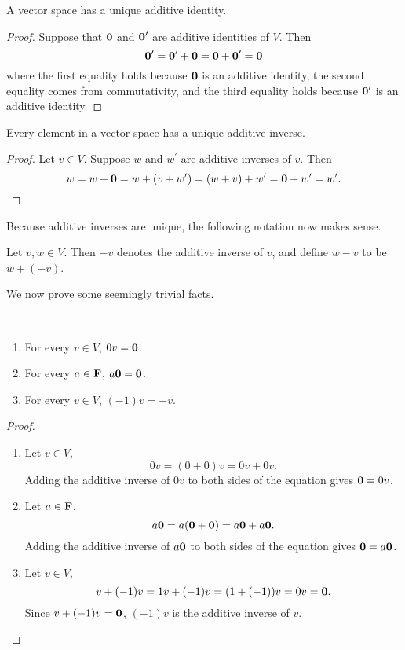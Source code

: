 \begin{lemma}
A vector space has a unique additive identity.
\end{lemma}

\begin{proof}
Suppose that $\vb{0}$ and $\vb{0}^\prime$ are additive identities of $V$. Then
\[\vb{0}^\prime=\vb{0}^\prime+\vb{0}=\vb{0}+\vb{0}^\prime=\vb{0}\]
where the first equality holds because $\vb{0}$ is an additive identity, the second equality comes from commutativity, and the third equality holds because $\vb{0}^\prime$ is an additive identity.
\end{proof}

\begin{lemma}
Every element in a vector space has a unique additive inverse.
\end{lemma}

\begin{proof}
Let $v\in V$. Suppose $w$ and $w^\prime$ are additive inverses of $v$. Then
\[w=w+\vb{0}=w+(v+w^\prime)=(w+v)+w^\prime=\vb{0}+w^\prime=w^\prime.\]
\end{proof}

Because additive inverses are unique, the following notation now makes sense.

\begin{notation}
Let $v,w\in V$. Then $-v$ denotes the additive inverse of $v$, and define $w-v$ to be $w+(-v)$.
\end{notation}

We now prove some seemingly trivial facts.

\begin{lemma} \
\begin{enumerate}[label=(\roman*)]
\item For every $v\in V$, $0v=\vb{0}$.
\item For every $a\in\mathbf F$, $a\vb{0}=\vb{0}$.
\item For every $v\in V$, $(-1)v=-v$.
\end{enumerate}
\end{lemma}

\begin{proof} \
\begin{enumerate}[label=(\roman*)]
\item Let $v\in V$,
\[0v=(0+0)v=0v+0v.\]
Adding the additive inverse of $0v$ to both sides of the equation gives $\vb{0}=0v$.

\item Let $a\in\mathbf F$,
\[a\vb{0}=a(\vb{0}+\vb{0})=a\vb{0}+a\vb{0}.\]
Adding the additive inverse of $a\vb{0}$ to both sides of the equation gives $\vb{0}=a\vb{0}$.

\item Let $v\in V$,
\[v+(-1)v=1v+(-1)v=(1+(-1))v=0v=\vb{0}.\]
Since $v+(-1)v=\vb{0}$, $(-1)v$ is the additive inverse of $v$.
\end{enumerate}
\end{proof}

